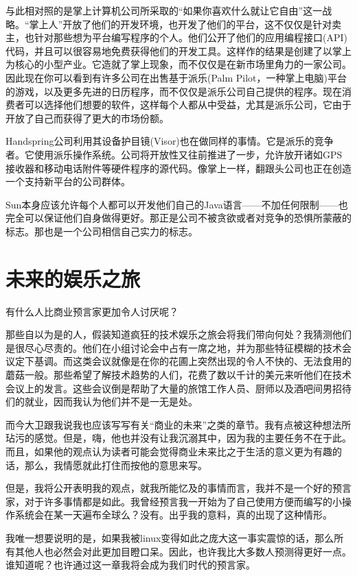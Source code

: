 与此相对照的是掌上计算机公司所采取的“如果你喜欢什么就让它自由”这一战略。“掌上人”开放了他们的开发环境，也开发了他们的平台，这不仅仅是针对卖主，也针对那些想为平台编写程序的个人。他们公开了他们的应用编程接口(API)代码，并且可以很容易地免费获得他们的开发工具。这样作的结果是创建了以掌上为核心的小型产业。它造就了掌上现象，而不仅仅是在新市场里角力的一家公司。因此现在你可以看到有许多公司在出售基于派乐(Palm Pilot，一种掌上电脑)平台的游戏，以及更多先进的日历程序，而不仅仅是派乐公司自己提供的程序。现在消费者可以选择他们想要的软件，这样每个人都从中受益，尤其是派乐公司，它由于开放了自己而获得了更大的市场份额。

Handspring公司利用其设备护目镜(Visor)也在做同样的事情。它是派乐的竞争者。它使用派乐操作系统。公司将开放性又往前推进了一步，允许放开诸如GPS接收器和移动电话附件等硬件程序的源代码。像掌上一样，翻跟头公司也正在创造一个支持新平台的公司群体。

Sun本身应该允许每个人都可以开发他们自己的Java语言——不加任何限制——也完全可以保证他们自身做得更好。那正是公司不被贪欲或者对竞争的恐惧所蒙蔽的标志。那也是一个公司相信自己实力的标志。

 
\section{未来的娱乐之旅}

有什么人比商业预言家更加令人讨厌呢？

那些自以为是的人，假装知道疯狂的技术娱乐之旅会将我们带向何处？我猜测他们是很尽心尽责的。他们在小组讨论会中占有一席之地，并为那些特征模糊的技术会议定下基调。而这类会议就像是在你的花圃上突然出现的令人不快的、无法食用的蘑菇一般。那些希望了解技术趋势的人们，花费了数以千计的美元来听他们在技术会议上的发言。这些会议倒是帮助了大量的旅馆工作人员、厨师以及酒吧间男招待们的就业，因而我认为他们并不是一无是处。

而今大卫跟我说我也应该写写有关“商业的未来”之类的章节。我有点被这种想法所玷污的感觉。但是，嗨，他也并没有让我沉溺其中，因为我的主要任务不在于此。而且，如果他的观点认为读者可能会觉得商业未来比之于生活的意义更为有趣的话，那么，我情愿就此打住而按他的意思来写。

但是，我将公开表明我的观点，就我所能忆及的事情而言，我并不是一个好的预言家，对于许多事情都是如此。我曾经预言我一开始为了自己使用方便而编写的小操作系统会在某一天遍布全球么？没有。出乎我的意料，真的出现了这种情形。

我唯一想要说明的是，如果我被linux变得如此之庞大这一事实震惊的话，那么所有其他人也必然会对此更加目瞪口呆。因此，也许我比大多数人预测得更好一点。谁知道呢？也许通过这一章我将会成为我们时代的预言家。

